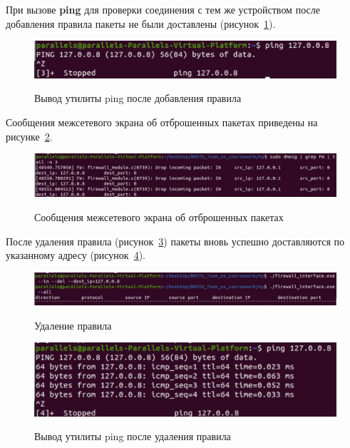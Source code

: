 \clearpage
При вызове \textbf{ping} для проверки соединения с тем же устройством после добавления правила пакеты не были доставлены (рисунок~\ref{img:ip_ping_middle}).

\begin{figure}[h!]
	\begin{center}
		{\includegraphics[scale = 0.35]{inc/img/ip_ping_middle.jpg}}
		\caption{Вывод утилиты ping после добавления правила}
		\label{img:ip_ping_middle}
	\end{center}
\end{figure}

Сообщения межсетевого экрана об отброшенных пакетах приведены на рисунке~\ref{img:ip_mes}.

\begin{figure}[h!]
	\begin{center}
		{\includegraphics[scale = 0.35]{inc/img/ip_mes.jpg}}
		\caption{Сообщения межсетевого экрана об отброшенных пакетах}
		\label{img:ip_mes}
	\end{center}
\end{figure}

После удаления правила (рисунок~\ref{img:ip_delete}) пакеты вновь успешно доставляются по указанному адресу (рисунок~\ref{img:ip_ping_after}).


\begin{figure}[h!]
	\begin{center}
		{\includegraphics[scale = 0.35]{inc/img/ip_delete.jpg}}
		\caption{Удаление правила}
		\label{img:ip_delete}
	\end{center}
\end{figure}


\begin{figure}[h!]
	\begin{center}
		{\includegraphics[scale = 0.35]{inc/img/ip_ping_after.jpg}}
		\caption{Вывод утилиты ping после удаления правила}
		\label{img:ip_ping_after}
	\end{center}
\end{figure}


